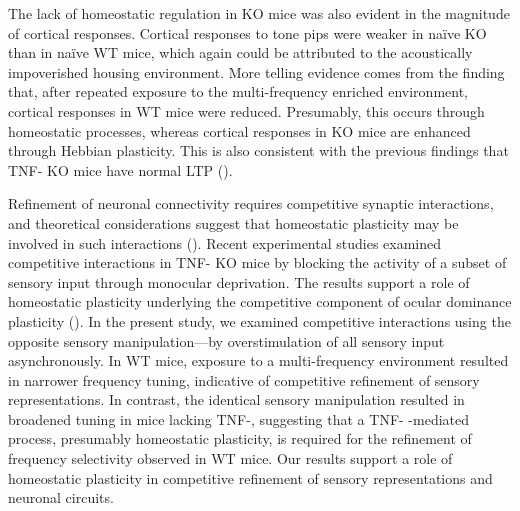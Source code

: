 The lack of homeostatic regulation in KO mice was also evident in the magnitude of cortical responses. Cortical responses to tone pips were weaker in na\"ive KO than in na\"ive WT mice, which again could be attributed to the acoustically impoverished housing environment. More telling evidence comes from the finding that, after repeated exposure to the multi-frequency enriched environment, cortical responses in WT mice were reduced. Presumably, this occurs through homeostatic processes, whereas cortical responses in KO mice are enhanced through Hebbian plasticity. This is also consistent with the previous findings that TNF-\textalpha{} KO mice have normal LTP (\cite{Albensi2000, Stellwagen2006, Kaneko2008}).

Refinement of neuronal connectivity requires competitive synaptic interactions, and theoretical considerations suggest that homeostatic plasticity may be involved in such interactions (\cite{Davis2001, Burrone2003, Turrigiano2004}). Recent experimental studies examined competitive interactions in TNF-\textalpha{} KO mice by blocking the activity of a subset of sensory input through monocular deprivation. The results support a role of homeostatic plasticity underlying the competitive component of ocular dominance plasticity (\cite{Kaneko2008, Ranson2012}). In the present study, we examined competitive interactions using the opposite sensory manipulation---by overstimulation of all sensory input asynchronously. In WT mice, exposure to a multi-frequency environment resulted in narrower frequency tuning, indicative of competitive refinement of sensory representations. In contrast, the identical sensory manipulation resulted in broadened tuning in mice lacking TNF-\textalpha{}, suggesting that a TNF-\textalpha{} -mediated process, presumably homeostatic plasticity, is required for the refinement of frequency selectivity observed in WT mice. Our results support a role of homeostatic plasticity in competitive refinement of sensory representations and neuronal circuits.

